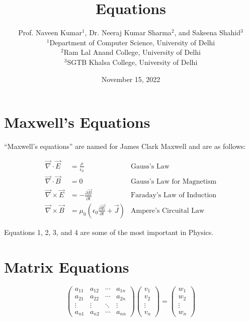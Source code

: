 \documentclass{article}
\title{Equations}
\author{Prof. Naveen Kumar$^1$, Dr. Neeraj Kumar Sharma$^2$, and Sakeena Shahid$^3$\\
\small $^1$Department of Computer Science, University of Delhi\\
\small $^2$Ram Lal Anand College, University of Delhi\\
\small $^3$SGTB Khalsa College, University of Delhi}
\date{November 15, 2022}
\begin{document}
\maketitle

\section{Maxwell's Equations}

``Maxwell's equations'' are named for James Clark Maxwell and are as follows:

\begin{align}
\vec{\nabla} \cdot \vec{E} &= \frac{\rho}{\epsilon_0} & \text{Gauss's Law}\label{eq:gauss}\\
\vec{\nabla} \cdot \vec{B} &= 0 & \text{Gauss's Law for Magnetism}\label{eq:gaussmag}\\
\vec{\nabla} \times \vec{E} &= -\frac{\partial\vec{B}}{\partial t} & \text{Faraday's Law of Induction}\label{eq:faraday}\\
\vec{\nabla} \times \vec{B} &= \mu_0\left(\epsilon_0\frac{\partial\vec{E}}{\partial t} + \vec{J}\right) & \text{Ampere's Circuital Law}\label{eq:ampere}
\end{align}

Equations 1, 2, 3, and 4 are some of the most important in Physics.

\section{Matrix Equations}

\begin{equation}
\begin{pmatrix}
a_{11} & a_{12} & \cdots & a_{1n} \\
a_{21} & a_{22} & \cdots & a_{2n} \\
\vdots & \vdots & \ddots & \vdots \\
a_{n1} & a_{n2} & \cdots & a_{nn}
\end{pmatrix}
\begin{pmatrix}
v_1 \\
v_2 \\
\vdots \\
v_n
\end{pmatrix} =
\begin{pmatrix}
w_1 \\
w_2 \\
\vdots \\
w_n
\end{pmatrix}
\end{equation}
\end{document}
